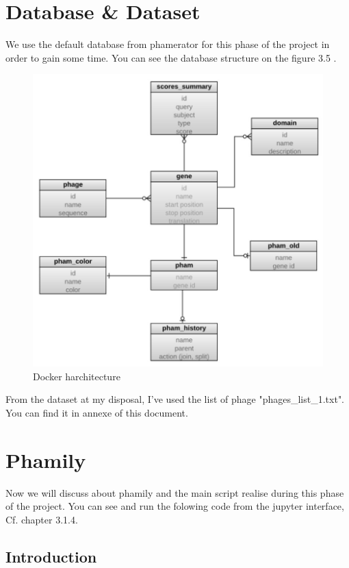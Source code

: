\documentclass[a4paper,11pt]{report}
\begin{document}
\section{Database \& Dataset}
We use the default database from phamerator for this phase of the project in order to gain some time. You can see the database structure on the figure 3.5 .

\begin{figure}[H] 
	\begin{center}
		\includegraphics[scale=0.6]{img/12859_2011_Article_4954_Fig1_HTML}
		\caption{Docker harchitecture}
	\end{center}
\end{figure}

From the dataset at my disposal, I've used the list of phage "phages\_list\_1.txt". You can find it in annexe of this document.


\section{Phamily}
Now we will discuss about phamily and the main script realise during this phase of the project. You can see and run the folowing code from the jupyter interface, Cf. chapter 3.1.4.

\subsection{Introduction}
\end{document}
